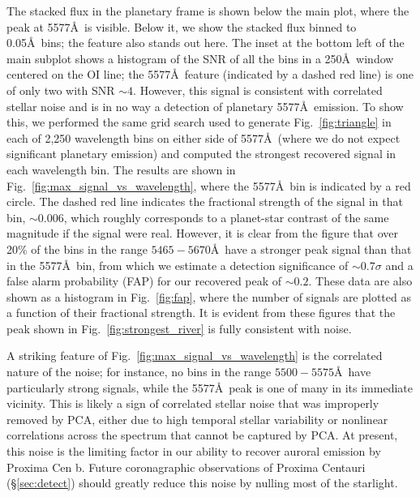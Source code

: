 \documentclass{emulateapj}
\begin{document}
The stacked flux in the planetary frame is shown below the main plot, where the peak at 5577\AA\ is visible. Below it, we show the stacked flux binned to 0.05\AA\ bins; the feature also stands out here. The inset at the bottom left of the main subplot shows a histogram of the SNR of all the bins in a 250\AA\ window centered on the OI line; the 5577\AA\ feature (indicated by a dashed red line) is one of only two with SNR ${\sim} 4$. However, this signal is consistent with correlated stellar noise and is in no way a detection of planetary 5577\AA\ emission. To show this, we performed the same grid search used to generate Fig.~\ref{fig:triangle} in each of 2,250 wavelength bins on either side of 5577\AA\ (where we do not expect significant planetary emission) and computed the strongest recovered signal in each wavelength bin. The results are shown in Fig.~\ref{fig:max_signal_vs_wavelength}, where the 5577\AA\ bin is indicated by a red circle. The dashed red line indicates the fractional strength of the signal in that bin, ${\sim} 0.006$, which roughly corresponds to a planet-star contrast of the same magnitude if the signal were real. However, it is clear from the figure that over 20\% of the bins in the range $5465-5670$\AA\ have a stronger peak signal than that in the 5577\AA\ bin, from which we estimate a detection significance of ${\sim} 0.7\sigma$ and a false alarm probability (FAP) for our recovered peak of ${\sim} 0.2$. These data are also shown as a histogram in Fig.~\ref{fig:fap}, where the number of signals are plotted as a function of their fractional strength. It is evident from these figures that the peak shown in Fig.~\ref{fig:strongest_river} is fully consistent with noise.

A striking feature of Fig.~\ref{fig:max_signal_vs_wavelength} is the correlated nature of the noise; for instance, no bins in the range $5500 - 5575$\AA\ have particularly strong signals, while the 5577\AA\ peak is one of many in its immediate vicinity. This is likely a sign of correlated stellar noise that was improperly removed by PCA, either due to high temporal stellar variability or nonlinear correlations across the spectrum that cannot be captured by PCA. At present, this noise is the limiting factor in our ability to recover auroral emission by Proxima Cen b. Future coronagraphic observations of Proxima Centauri (\S\ref{sec:detect}) should greatly reduce this noise by nulling most of the starlight.
\end{document}

